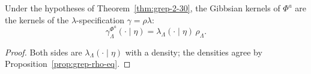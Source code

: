 \begin{corollary}
    \label{cor:grep-gibbsian-spec}
    \leanok

    Under the hypotheses of Theorem~\ref{thm:grep-2-30}, the Gibbsian kernels of $\Phi^a$ are the
    kernels of the $\lambda$-specification $\gamma = \rho\lambda$:
    \[
        \gamma^{\Phi^a}_\Lambda(\cdot \mid \eta) = \lambda_\Lambda(\cdot \mid \eta)\,\rho_\Lambda .
    \]
\end{corollary}
\begin{proof}
    \leanok

    Both sides are $\lambda_\Lambda(\cdot\mid\eta)$ with a density; the densities agree by
    Proposition~\ref{prop:grep-rho-eq}.
\end{proof}

